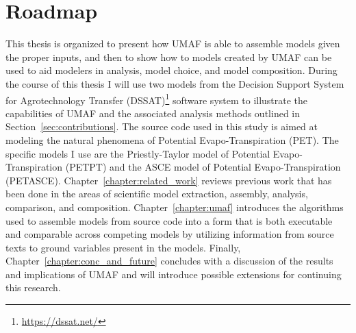 \section{Roadmap\label{sec:roadmap}}
This thesis is organized to present how UMAF is able to assemble models given the proper inputs, and then to show how to models created by UMAF can be used to aid modelers in analysis, model choice, and model composition.
During the course of this thesis I will use two models from the Decision Support System for Agrotechnology Transfer (DSSAT)\footnote{\url{https://dssat.net/}} software system \citep{DSSAT} to illustrate the capabilities of UMAF and the associated analysis methods outlined in Section~\ref{sec:contributions}.
The source code used in this study is aimed at modeling the natural phenomena of Potential Evapo-Transpiration (PET).
The specific models I use are the Priestly-Taylor model of Potential Evapo-Transpiration (PETPT) and the ASCE model of Potential Evapo-Transpiration (PETASCE).
Chapter~\ref{chapter:related_work} reviews previous work that has been done in the areas of scientific model extraction, assembly, analysis, comparison, and composition.
Chapter~\ref{chapter:umaf} introduces the algorithms used to assemble models from source code into a form that is both executable and comparable across competing models by utilizing information from source texts to ground variables present in the models.
Finally, Chapter~\ref{chapter:conc_and_future} concludes with a discussion of the results and implications of UMAF and will introduce possible extensions for continuing this research.
